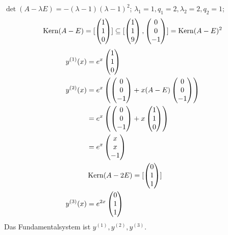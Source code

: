 \documentclass{article}
\begin{document}
\begin{beispiele}
$\det(A-\lambda E) = -(\lambda-1)(\lambda-1)^2$; $\lambda_1 = 1, q_1=2, \lambda_2=2, q_2 = 1$; 
\[\mathop{\rm Kern}\nolimits(A-E)= [
\begin{pmatrix}
1\\1\\0
\end{pmatrix}] \subseteq [
\begin{pmatrix}
1\\1\\9
\end{pmatrix} , 
\begin{pmatrix}
0\\0\\-1
\end{pmatrix}] = \mathop{\rm Kern}\nolimits (A-E)^2\]
\begin{align*}
y^{(1)}(x) &= e^x
\begin{pmatrix}
1\\1\\0
\end{pmatrix} \\
y^{(2)}(x) &= e^x\left(
\begin{pmatrix}
0\\0\\-1
\end{pmatrix} + x(A-E)
\begin{pmatrix}
0\\0\\-1
\end{pmatrix}\right) \\
&= e^x\left(
\begin{pmatrix}
0\\0\\-1
\end{pmatrix} + x
\begin{pmatrix}
1\\1\\0
\end{pmatrix}\right) \\
&= e^x
\begin{pmatrix}
x\\x\\-1
\end{pmatrix}\\
& \mathop{\rm Kern}\nolimits(A-2E) = [
\begin{pmatrix}
0\\1\\1
\end{pmatrix}] \\
y^{(3)}(x) &= e^{2x}
\begin{pmatrix}
0\\1\\1
\end{pmatrix}
\end{align*}
Das Fundamentalsystem ist $y^{(1)}, y^{(2)}, y^{(3)}$.


\end{beispiele}
\end{document}
